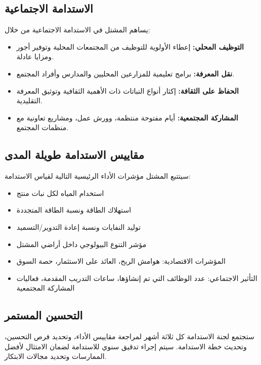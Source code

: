 \subsection{الاستدامة الاجتماعية}

يساهم المشتل في الاستدامة الاجتماعية من خلال:

\begin{itemize}
    \item \textbf{التوظيف المحلي:} إعطاء الأولوية للتوظيف من المجتمعات المحلية وتوفير أجور ومزايا عادلة.
    
    \item \textbf{نقل المعرفة:} برامج تعليمية للمزارعين المحليين والمدارس وأفراد المجتمع.
    
    \item \textbf{الحفاظ على الثقافة:} إكثار أنواع النباتات ذات الأهمية الثقافية وتوثيق المعرفة التقليدية.
    
    \item \textbf{المشاركة المجتمعية:} أيام مفتوحة منتظمة، وورش عمل، ومشاريع تعاونية مع منظمات المجتمع.
\end{itemize}

\subsection{مقاييس الاستدامة طويلة المدى}

سيتتبع المشتل مؤشرات الأداء الرئيسية التالية لقياس الاستدامة:

\begin{itemize}
    \item استخدام المياه لكل نبات منتج
    \item استهلاك الطاقة ونسبة الطاقة المتجددة
    \item توليد النفايات ونسبة إعادة التدوير/التسميد
    \item مؤشر التنوع البيولوجي داخل أراضي المشتل
    \item المؤشرات الاقتصادية: هوامش الربح، العائد على الاستثمار، حصة السوق
    \item التأثير الاجتماعي: عدد الوظائف التي تم إنشاؤها، ساعات التدريب المقدمة، فعاليات المشاركة المجتمعية
\end{itemize}

\subsection{التحسين المستمر}

ستجتمع لجنة الاستدامة كل ثلاثة أشهر لمراجعة مقاييس الأداء، وتحديد فرص التحسين، وتحديث خطة الاستدامة. سيتم إجراء تدقيق سنوي للاستدامة لضمان الامتثال لأفضل الممارسات وتحديد مجالات الابتكار. 